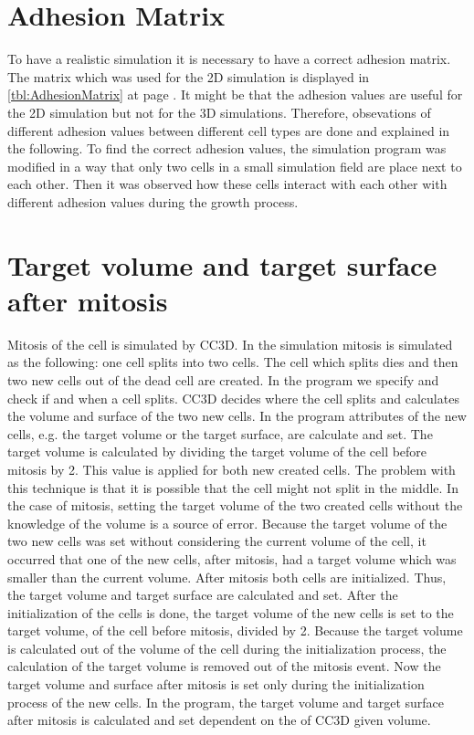 \section{Adhesion Matrix}\label{sec:AdhesionMatrix}
To have a realistic simulation it is necessary to have a correct adhesion matrix. The matrix which was used for the 2D simulation is displayed in \ref{tbl:AdhesionMatrix} at page \pageref{tbl:AdhesionMatrix}. It might be that the adhesion values are useful for the 2D simulation but not for the 3D simulations. Therefore, obsevations of different adhesion values between different cell types are done and explained in the following. \newline
To find the correct adhesion values, the simulation program was modified in a way that only two cells in a small simulation field are place next to each other. Then it was observed how these cells interact with each other with different adhesion values during the growth process.

\section{Target volume and target surface after mitosis} \label{sec:TargetVolumeSurfaceAfterMitosis}
Mitosis of the cell is simulated by \ac{CC3D}. In the simulation mitosis is simulated as the following: one cell splits into two cells. The cell which splits dies and then two new cells out of the dead cell are created. \newline
In the program we specify and check if and when a cell splits. \ac{CC3D} decides where the cell splits and calculates the volume and surface of the two new cells. In the program attributes of the new cells, e.g. the target volume or the target surface, are calculate and set. \newline 
The target volume is calculated by dividing the target volume of the cell before mitosis by 2. This value is applied for both new created cells. The problem with this technique is that it is possible that the cell might not split in the middle. In the case of mitosis, setting the target volume of the two created cells without the knowledge of the volume is a source of error. Because the target volume of the two new cells was set without considering the current volume of the cell, it occurred that one of the new cells, after mitosis, had a target volume which was smaller than the current volume. \newline
After mitosis both cells are initialized. Thus, the target volume and target surface are calculated and set. After the initialization of the cells is done, the target volume of the new cells is set to the target volume, of the cell before mitosis, divided by 2. \newline
Because the target volume is calculated out of the volume of the cell during the initialization process, the calculation of the target volume is removed out of the mitosis event. Now the target volume and surface after mitosis is set only during the initialization process of the new cells. \newline
In the program, the target volume and target surface after mitosis is calculated and set dependent on the of \ac{CC3D} given volume.



